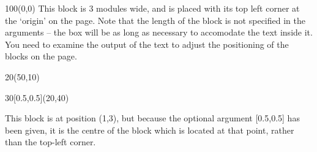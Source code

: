 \documentclass{beamer}
\begin{document}
\begin{frame}
\begin{textblock}{100}(0,0)
This block is 3 modules wide, and is placed with its top left corner
at the `origin' on the page. Note that the length of the block is not
specified in the arguments -- the box will be as long as necessary to
accomodate the text inside it. You need to examine the output of the
text to adjust the positioning of the blocks on the page.
\end{textblock}
 
\begin{textblock}{20}(50,10)
\end{textblock}
 
\begin{textblock}{30}[0.5,0.5](20,40)
\begin{minipage}{0.7\paperwidth}
This block is at position (1,3), but because the optional argument
[0.5,0.5] has been given, it is the centre of the block which is
located at that point, rather than the top-left corner.
\end{minipage}
\end{textblock}
\end{frame}
 
\end{document}
